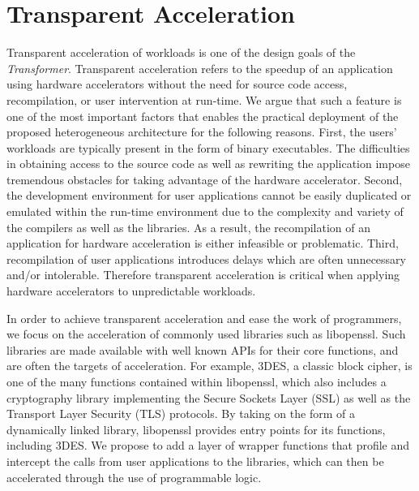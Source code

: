 \section{Transparent Acceleration}
\label{sec_transacc}


Transparent acceleration of workloads is one of the design goals of
the {\em Transformer}. Transparent acceleration refers to the speedup of
an application using hardware accelerators without the need for source
code access, recompilation, or user intervention at run-time. We argue that such a feature is one of
the most important factors that enables the practical deployment of the
proposed heterogeneous architecture for the following reasons. 
First, the users'
workloads are typically present in the form of binary executables. The difficulties in obtaining access to the source code as well as 
rewriting the application impose tremendous obstacles for taking
advantage of the hardware accelerator. Second, the development environment
for user applications cannot be easily duplicated or emulated within
the run-time environment due to the complexity and variety of
the compilers as well as the libraries. As a result, the recompilation of an
application for hardware acceleration is either infeasible or
problematic. Third, recompilation of user applications introduces
delays which are often unnecessary and/or intolerable. Therefore
transparent acceleration is critical when applying hardware accelerators to unpredictable
workloads.

In order to achieve transparent acceleration and ease the work of programmers,
we focus on the acceleration of commonly used libraries such as
libopenssl. Such libraries are made available with well known APIs for
their core functions, and are often the targets of acceleration. For
example, 3DES, a classic block cipher, is one of the many functions
contained within libopenssl, which also includes a cryptography library implementing the Secure
Sockets Layer (SSL) as well as the Transport Layer Security
(TLS)\cite{wikissl} protocols. By taking on the form of a dynamically linked
library, libopenssl provides entry points for its functions, including
3DES. We propose to add a layer of wrapper functions that profile and
intercept the calls from user applications to the libraries, which can then
be accelerated through the use of programmable logic. 


